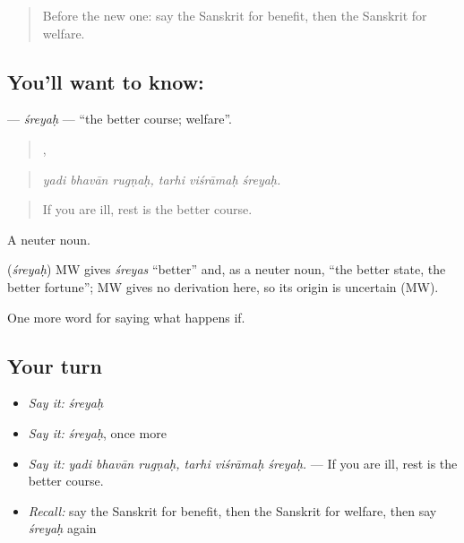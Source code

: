 \label{lesson:SA-C382-sreyah}



\begin{quote}
Before the new one: say the Sanskrit for benefit, then the Sanskrit for welfare.
\end{quote}

\subsection*{You'll want to know: }
\textbf{} — \emph{śreyaḥ} — \textquotedblleft{}the better course; welfare\textquotedblright{}.

\begin{quote}
  ,   
\end{quote}

\begin{quote}
\emph{yadi bhavān rugṇaḥ, tarhi viśrāmaḥ śreyaḥ.}
\end{quote}

\begin{quote}
If you are ill, rest is the better course.
\end{quote}

A neuter noun.

\begin{cousinweb}
\textbf{} (\emph{śreyaḥ}) MW gives \emph{śreyas} \textquotedblleft{}better\textquotedblright{} and, as a neuter noun, \textquotedblleft{}the better state, the better fortune\textquotedblright{}; MW gives no derivation here, so its origin is uncertain (MW).
\end{cousinweb}

\begin{grammarlens}[title={What you've built}]
One more word for saying what happens if.
\end{grammarlens}

\subsection*{Your turn}
\begin{itemize}
\raggedright
  \item \emph{Say it:} \emph{śreyaḥ}
  \item \emph{Say it:} \emph{śreyaḥ}, once more
  \item \emph{Say it:} \emph{yadi bhavān rugṇaḥ, tarhi viśrāmaḥ śreyaḥ.} — If you are ill, rest is the better course.
  \item \emph{Recall:} say the Sanskrit for benefit, then the Sanskrit for welfare, then say \emph{śreyaḥ} again
\end{itemize}

